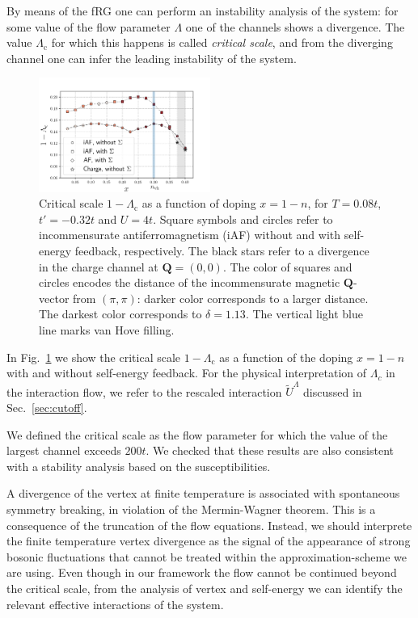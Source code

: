 By means of the fRG one can perform an instability analysis of the system: 
for some value of the flow parameter $\Lambda$ one of the channels shows a divergence. 
The value $\Lambda_{\mathrm{c}} $ for which this happens is called \textit{critical scale}, and from the diverging channel one can infer the leading instability of the system. 
%
\begin{figure}
\includegraphics[width=0.5\textwidth]{images/phasediag.png}
\caption{Critical scale $1-\Lambda_{\mathrm{c}}$ as a function of doping $x=1-n$, for $T = 0.08t$, $t'=-0.32t$ and $U=4t$. 
Square symbols and circles refer to incommensurate antiferromagnetism (iAF) without and with self-energy feedback, respectively.
The black stars refer to a divergence in the charge channel at $\mathbf{Q} = (0,0)$.
The color of squares and circles encodes the distance of the incommensurate magnetic $\mathbf{Q}$-vector from $(\pi,\pi)$: darker color corresponds to a larger distance. The darkest color corresponds to $\delta=1.13$. 
The vertical light blue line marks van Hove filling.}  
\label{fig:criscale} 
\end{figure}
%
In Fig.~\ref{fig:criscale} we show the critical scale $1-\Lambda_{\mathrm{c}}$ as a function of the doping $x=1-n$ with and without self-energy feedback.
For the physical interpretation of $\Lambda_c$ in the interaction flow, we refer to the rescaled interaction\cite{Honerkamp2004} $\tilde U ^\Lambda$ discussed in Sec.~\ref{sec:cutoff}.  

We defined the critical scale as the flow parameter for which the value of the largest channel exceeds $200t$. We checked that these results are also consistent with a stability analysis based on the susceptibilities.        

A divergence of the vertex at finite temperature is associated with spontaneous symmetry breaking, in violation of the Mermin-Wagner theorem.\cite{Mermin1966}
This is a consequence of the truncation of the flow equations.
Instead, we should interprete the finite temperature vertex divergence as the signal of the appearance of strong bosonic fluctuations that cannot be treated within the approximation-scheme we are using.\cite{Salmhofer2001} 
Even though in our framework the flow cannot be continued beyond the critical scale, from the analysis of vertex and self-energy we can identify the relevant effective interactions of the system.

